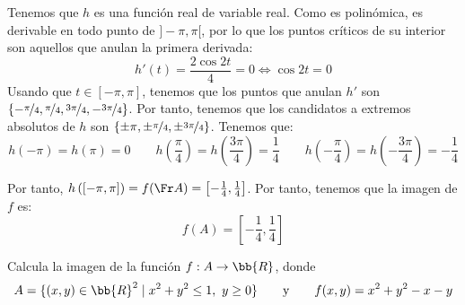 \begin{ejercicio}
    Tenemos que $h$ es una función real de variable real. Como es polinómica, es derivable en todo punto de $]-\pi,\pi[$, por lo que los puntos críticos de su interior son aquellos que anulan la primera derivada:
    \begin{equation*}
        h'(t) = \frac{2\cos 2t}{4} = 0 \Longleftrightarrow \cos 2t = 0
    \end{equation*}
    Usando que $t\in [-\pi,\pi]$, tenemos que los puntos que anulan $h'$ son $\{-\nicefrac{\pi}{4},\nicefrac{\pi}{4},\nicefrac{3\pi}{4},-\nicefrac{3\pi}{4}\}$.
    Por tanto, tenemos que los candidatos a extremos absolutos de $h$ son $\{\pm\pi,\pm\nicefrac{\pi}{4},\pm\nicefrac{3\pi}{4}\}$. Tenemos que:
    \begin{equation*}
        h(-\pi)=h(\pi)=0 \qquad h\left(\frac{\pi}{4}\right)=h\left(\frac{3\pi}{4}\right)=\frac{1}{4}
        \qquad 
        h\left(-\frac{\pi}{4}\right)=h\left(-\frac{3\pi}{4}\right)=-\frac{1}{4}
    \end{equation*}

    Por tanto, $h\left(\left[-\pi,\pi\right]\right)=f(\Fr A) = \left[-\frac{1}{4}, \frac{1}{4}\right]$. Por tanto, tenemos que la imagen de $f$ es:
    \begin{equation*}
        f(A) = \left[-\frac{1}{4},\frac{1}{4}\right]
    \end{equation*}
\end{ejercicio}



\begin{ejercicio}
    Calcula la imagen de la función $f:A\to \bb{R}$, donde
    \begin{equation*}
        A = \{(x,y)\in \bb{R}^2\mid x^2+y^2\leq 1,~y\geq 0\}
        \qquad \text{y} \qquad
        f(x,y)=x^2+y^2-x-y
    \end{equation*}
\end{ejercicio}